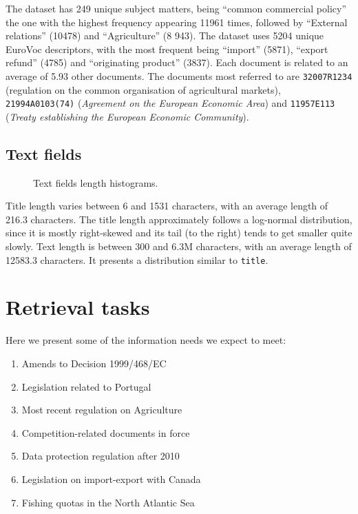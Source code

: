 \documentclass[sigconf, authorversion]{acmart}
\begin{document}
The dataset has 249 unique subject matters, being ``common commercial policy'' the one with the highest frequency appearing \SI{11961}{} times, followed by ``External relations'' (\SI{10478}{}) and ``Agriculture'' (8 943).
The dataset uses \SI{5204}{} unique EuroVoc descriptors, with the most frequent being ``import''  (\SI{5871}{}), ``export refund'' (\SI{4785}{}) and ``originating product'' (\SI{3837}{}).
Each document is related to an average of 5.93 other documents. The documents most referred to are \texttt{32007R1234} (regulation on the common organisation of agricultural markets), \texttt{21994A0103(74)} (\textit{Agreement on the European Economic Area}) and \texttt{11957E113} (\textit{Treaty establishing the European Economic Community}).

\subsection{Text fields}

\begin{figure}[ht]
    \centering
    \begin{minipage}[t]{0.5\linewidth}
        \centering
        
    \end{minipage}%
    \begin{minipage}[t]{0.5\linewidth}
        \centering
        
    \end{minipage}
    \caption{Text fields length histograms.}
\end{figure}

Title length varies between 6 and \SI{1531}{} characters, with an average length of 216.3 characters. The title length approximately follows a log-normal distribution, since it is mostly right-skewed and its tail (to the right) tends to get smaller quite slowly.
Text length is between 300 and 6.3M characters, with an average length of \SI{12583.3}{} characters. It presents a distribution similar to \texttt{title}.

\section{Retrieval tasks}
\label{sec:retrieval-tasks}

Here we present some of the information needs we expect to meet:

\begin{enumerate}
    \item Amends to Decision 1999/468/EC
    \item Legislation related to Portugal
    \item Most recent regulation on Agriculture
    \item Competition-related documents in force
    \item Data protection regulation after 2010
    \item Legislation on import-export with Canada
    \item Fishing quotas in the North Atlantic Sea
\end{enumerate}
\end{document}
